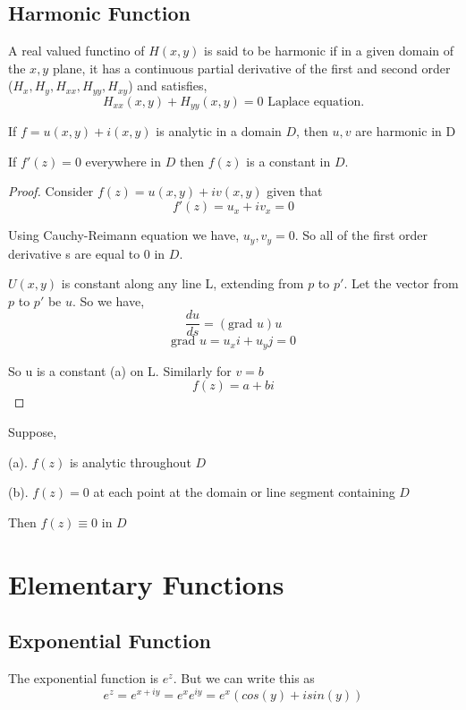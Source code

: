 \section{Harmonic Function}

\begin{definition}
   A real valued functino of $H(x,y)$ is said to be harmonic if in a given domain of the $x,y$ plane, it has a continuous partial derivative of the first and second order ($H_x,H_y,H_{xx},H_{yy},H_{xy}$) and satisfies,  \[
      H_{xx}(x,y)  + H_{yy}(x,y) = 0 \text{ Laplace equation}
   .\] 

\end{definition}     


\begin{theorem}
   If $f = u(x,y) + i(x,y)$ is analytic in a domain $D$, then $u,v$ are harmonic in D
\end{theorem}


\begin{theorem}
   If $f'(z) = 0$ everywhere in $D$ then $f(z)$ is a constant in $D$.
\end{theorem}
\begin{proof}
   Consider $f(z) = u(x,y) + iv(x,y)$ given that $$f'(z) = u_x + iv_x = 0$$

   Using Cauchy-Reimann equation we have, $u_y,v_y = 0$. So all of the first order derivative s are equal to 0 in $D$.

   $U(x,y)$ is constant along any line L,  extending from $p$ to $p'$. Let the vector from $p$ to $p'$ be  $u$. So we have,  
   $$ \frac{du}{ds} = (\text{grad } u) u $$ 
   $$\text{grad } u = u_xi+ u_yj = 0 $$ 

   So u is a constant (a) on L. Similarly for $v = b$ 
   $$ f(z) = a + bi $$ 

\end{proof}

\begin{lemma}
   Suppose, 

   (a). $f(z)$ is analytic throughout $D$

   (b).  $f(z) = 0$ at each point at the domain or line segment containing $D$

   Then  $f(z) \equiv 0$ in $D$
\end{lemma}


\chapter{Elementary Functions}
\section{Exponential Function}
The exponential function is $e^z$. But we can write this as 
$$e^z = e^{x + iy} = e^x e^{iy} = e^x(cos(y) + isin(y))$$

